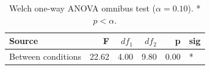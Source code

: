 \begin{table}[ht]
\centering
\caption{Welch one-way ANOVA omnibus test ($\alpha = 0.10$). * $p < \alpha$.} 
\label{tab:anova-omnibus}
\begin{tabular}{lrrrrl}
  \toprule
Source & F & $df_1$ & $df_2$ & p & sig \\ 
  \midrule
Between conditions & 22.62 & 4.00 & 9.80 & 0.00 & * \\ 
   \bottomrule
\end{tabular}
\end{table}
